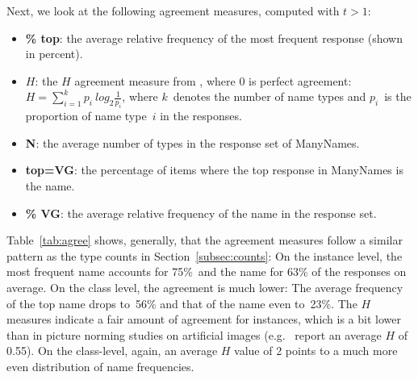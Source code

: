 Next, we look at the following agreement measures, computed with $t>1$: 
\begin{itemize}
\item \textbf{\% top}: the average relative frequency of the most frequent response (shown in percent).
\item \textbf{$H$}: the $H$ agreement measure from \citet{snodgrass}, where 0 is perfect agreement: \mbox{$H = \sum_{i=1}^k p_i~log_2\frac{1}{p_i}$}, 
where $k$\ denotes the number of name types and $p_i$\ is the proportion of name type\ $i$ in the responses. \item \textbf{N}: the average number of types in the response set of ManyNames.
\item \textbf{top=VG}: the percentage of items where the top response in ManyNames is the \vg name.
\item \textbf{\% VG}: the average relative frequency of the \vg name in the response set.
\end{itemize}


Table\ \ref{tab:agree} shows, generally, that the agreement measures follow a similar pattern as the type counts in Section\ \ref{subsec:counts}:
On the instance level, %
the most frequent name accounts for 75\%\  and the \vg name for 63\% of the responses on average. On the class level, the agreement is much lower: The average frequency of the top name drops to\ 56\% and that of the \vg name even to\ 23\%. The $H$ measures indicate a fair amount of agreement for instances, which is a bit lower than in picture norming studies on artificial images (e.g.\  report an average $H$ of 0.55). On the class-level, again, an average $H$ value of 2 points to a much more even distribution of name frequencies.

